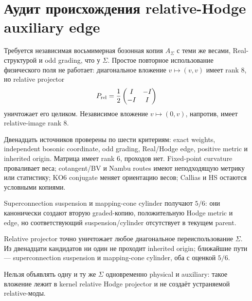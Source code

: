 \chapter{Аудит происхождения relative-Hodge auxiliary edge}
\label{ch:v10-h15-r2-relative-hodge-auxiliary-edge-origin-audit}

Требуется независимая восьмимерная бозонная копия $A_\Sigma$ с теми же
весами, Real-структурой и odd grading, что у $\Sigma$. Простое повторное
использование физического поля не работает: диагональное вложение
$v\mapsto(v,v)$ имеет rank $8$, но relative projector
\begin{equation}
 P_{\rm rel}=\frac12\begin{pmatrix}I&-I\\-I&I\end{pmatrix}
\end{equation}
уничтожает его целиком. Независимое вложение $v\mapsto(0,v)$, напротив,
имеет relative-image rank $8$.

Двенадцать источников проверены по шести критериям: exact weights,
independent bosonic coordinate, odd grading, Real/Hodge edge, positive
metric и inherited origin. Матрица имеет rank $6$, проходов нет.
Fixed-point curvature проваливает веса; cotangent/BV и Nambu routes имеют
неподходящую метрику или статистику; KO6 conjugate меняет ориентацию весов;
Callias и HS остаются условными копиями.

Superconnection suspension и mapping-cone cylinder получают $5/6$: они
канонически создают вторую graded-копию, положительную Hodge metric и edge,
но соответствующий suspension/cylinder отсутствует в текущем parent.

\begin{theorem}
Relative projector точно уничтожает любое диагональное переиспользование
$\Sigma$. Из двенадцати кандидатов ни один не проходит inherited origin;
ближайшие пути --- superconnection suspension и mapping-cone cylinder,
оба с оценкой $5/6$.
\end{theorem}

\begin{nogocriterion}
Нельзя объявлять одну и ту же $\Sigma$ одновременно physical и auxiliary:
такое вложение лежит в kernel relative Hodge projector и не создаёт
устраняемой relative-моды.
\end{nogocriterion}

